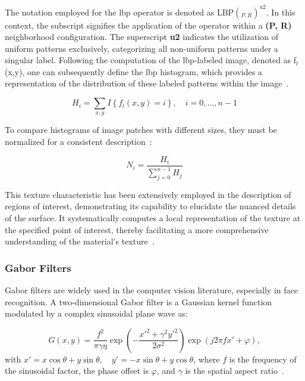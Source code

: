 The notation employed for the \ac{lbp} operator is denoted as $\text{LBP}(_{P, R})^{u2}$.
In this context, the subscript signifies the application of the operator within a \textbf{(P, R)} neighborhood configuration. The superscript \textbf{u2} indicates the utilization of uniform patterns exclusively, categorizing all non-uniform patterns under a singular label.
Following the computation of the \ac{lbp}-labeled image, denoted as f$_{l}$(x,y), one can subsequently define the \ac{lbp} histogram, which provides a representation of the distribution of these labeled patterns within the image~\cite{pietikainen_local_2010}.


\begin{equation} 
H_i = \sum_{x,y} I\left\{ f_l(x,y) = i \right\}, \quad i = 0, \ldots, n-1
\end{equation}

To compare histograms of image patches with different sizes, they must be normalized for a consistent description~\cite{pietikainen_local_2010}:

\begin{equation}
N_i = \frac{H_i}{\sum_{j=0}^{n-1} H_j}
\end{equation}

This texture characteristic has been extensively employed in the description of regions of interest, demonstrating its capability to elucidate the nuanced details of the surface. It systematically computes a local representation of the texture at the specified point of interest, thereby facilitating a more comprehensive understanding of the material's texture~\cite{kaur_review_2021}.


\subsubsection{Gabor Filters}

Gabor filters are widely used in the computer vision literature, especially in face recognition. A two-dimensional Gabor filter is a Gaussian kernel function modulated by a complex sinusoidal plane wave as:

\begin{equation}
G(x, y) = \frac{f^2}{\pi \gamma \eta} \exp\left( -\frac{x'^2 + \gamma^2 y'^2}{2\sigma^2} \right) \exp\left( j 2 \pi f x' + \varphi \right),
\end{equation}
with $x' = x \cos\theta + y \sin\theta, \quad y' = -x \sin\theta + y \cos\theta$,
where $f$ is the frequency of the sinusoidal factor, the phase offset is $\varphi$,  and  $\gamma$ is the spatial aspect ratio~\cite{farag_feature_2017}.


